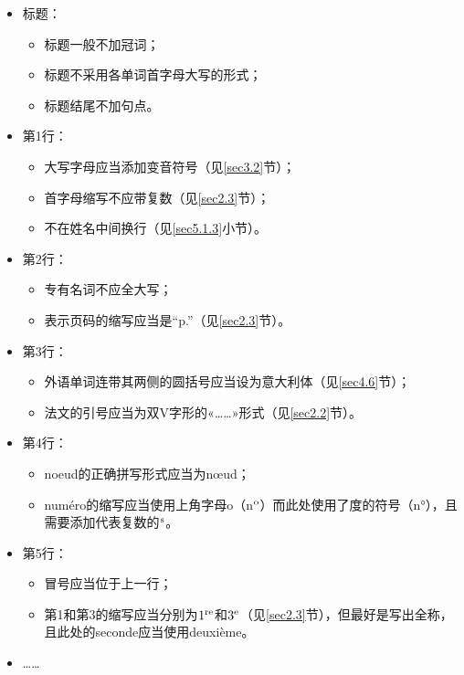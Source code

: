 \begin{itemize}
    \item 标题：
    \begin{itemize}
        \item 标题一般不加冠词；
        \item 标题不采用各单词首字母大写的形式；
        \item 标题结尾不加句点。
    \end{itemize} 
    \item 第1行：
    \begin{itemize}
        \item 大写字母应当添加变音符号（见\ref{sec3.2}节）；
        \item 首字母缩写不应带复数（见\ref{sec2.3}节）；
        \item 不在姓名中间换行（见\ref{sec5.1.3}小节）。
    \end{itemize}
    \item 第2行：
    \begin{itemize}
        \item 专有名词不应全大写；
        \item 表示页码的缩写应当是“p.”（见\ref{sec2.3}节）。
    \end{itemize}
    \item 第3行：
    \begin{itemize}
        \item 外语单词连带其两侧的圆括号应当设为意大利体（见\ref{sec4.6}节）；
        \item 法文的引号应当为双V字形的«……»形式（见\ref{sec2.2}节）。
    \end{itemize}
    \item 第4行：
    \begin{itemize}
        \item noeud的正确拼写形式应当为nœud；
        \item numéro的缩写应当使用上角字母o（n$^{\rm o}$）而此处使用了度的符号（n°），且需要添加代表复数的$^{\rm s}$。
    \end{itemize}
    \item 第5行：
    \begin{itemize}
        \item 冒号应当位于上一行；
        \item 第1和第3的缩写应当分别为$1^{\rm re}$和$3^{\rm e}$（见\ref{sec2.3}节），但最好是写出全称，且此处的seconde应当使用deuxième。
    \end{itemize}
    \item ……
\end{itemize}


